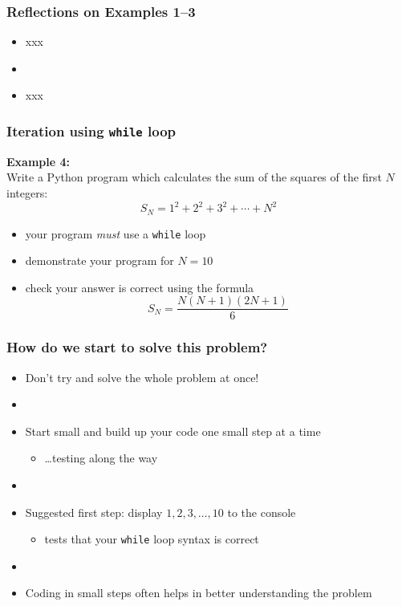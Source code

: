 \documentclass[english,14pt]{beamer}
\begin{document}
\begin{frame}[fragile]

\frametitle{Reflections on Examples 1--3}

\begin{itemize}
	\item xxx
	\item[]
	\item xxx
\end{itemize}
\end{frame}


\begin{frame}[fragile]

\frametitle{Iteration using \texttt{while} loop}

\textbf{Example 4:}\\
\vspace*{5mm}
Write a Python program which calculates the sum of the squares of the first $N$ integers:
\[
S_N = 1^2 + 2^2 + 3^2 + \cdots + N^2
\]

\begin{itemize}
	\item your program \emph{must} use a \texttt{while} loop
	\item demonstrate your program for $N=10$
	\item check your answer is correct using the formula
	\[
		S_N = \frac{N(N+1)(2N+1)}{6}
	\]

\end{itemize}

\end{frame}


\begin{frame}[fragile]

\frametitle{How do we start to solve this problem?}

\begin{itemize}
	\item Don't try and solve the whole problem at once!
	\item[]
	\item Start small and build up your code one small step at a time
	\begin{itemize}
		\item \ldots testing along the way
	\end{itemize}
	\item[]
	\item Suggested first step: display $1,2,3,\ldots,10$ to the console
	\begin{itemize}
		\item tests that your \texttt{while} loop syntax is correct
	\end{itemize}
	\item[]
	\item Coding in small steps often helps in better understanding the problem
\end{itemize}

\end{frame}
\end{document}
